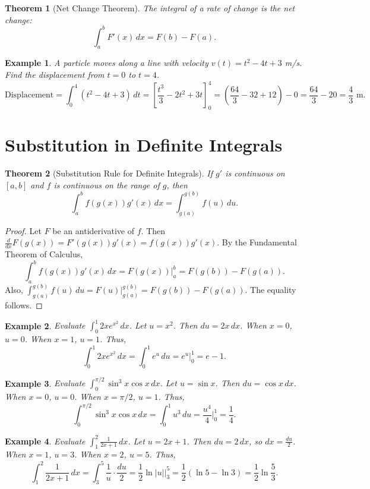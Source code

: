 \documentclass[11pt,a4paper]{article}
\newtheorem{example}{Example}
\newtheorem{theorem}{Theorem}
\begin{document}
\begin{theorem}[Net Change Theorem]
The integral of a rate of change is the net change:
\[
\int_a^b F'(x) \, dx = F(b) - F(a).
\]
\end{theorem}
\begin{example}
A particle moves along a line with velocity $v(t) = t^2 - 4t + 3$ m/s. Find the displacement from $t = 0$ to $t = 4$.
\[
\text{Displacement} = \int_0^4 (t^2 - 4t + 3) \, dt = \left[ \frac{t^3}{3} - 2t^2 + 3t \right]_0^4 = \left( \frac{64}{3} - 32 + 12 \right) - 0 = \frac{64}{3} - 20 = \frac{4}{3} \text{ m}.
\]
\end{example}
\section{Substitution in Definite Integrals}
\begin{theorem}[Substitution Rule for Definite Integrals]
If $g'$ is continuous on $[a, b]$ and $f$ is continuous on the range of $g$, then
\[
\int_a^b f(g(x)) g'(x) \, dx = \int_{g(a)}^{g(b)} f(u) \, du.
\]
\end{theorem}
\begin{proof}
Let $F$ be an antiderivative of $f$. Then $\frac{d}{dx} F(g(x)) = F'(g(x)) g'(x) = f(g(x)) g'(x)$. By the Fundamental Theorem of Calculus,
\[
\int_a^b f(g(x)) g'(x) \, dx = F(g(x)) \Big|_a^b = F(g(b)) - F(g(a)).
\]
Also, $\int_{g(a)}^{g(b)} f(u) \, du = F(u) \Big|_{g(a)}^{g(b)} = F(g(b)) - F(g(a))$. The equality follows.
\end{proof}
\begin{example}
Evaluate $\displaystyle \int_0^1 2x e^{x^2} \, dx$.
Let $u = x^2$. Then $du = 2x \, dx$. When $x = 0$, $u = 0$. When $x = 1$, $u = 1$. Thus,
\[
\int_0^1 2x e^{x^2} \, dx = \int_0^1 e^u \, du = e^u \Big|_0^1 = e - 1.
\]
\end{example}
\begin{example}
Evaluate $\displaystyle \int_0^{\pi/2} \sin^3 x \cos x \, dx$.
Let $u = \sin x$. Then $du = \cos x \, dx$. When $x = 0$, $u = 0$. When $x = \pi/2$, $u = 1$. Thus,
\[
\int_0^{\pi/2} \sin^3 x \cos x \, dx = \int_0^1 u^3 \, du = \frac{u^4}{4} \Big|_0^1 = \frac{1}{4}.
\]
\end{example}
\begin{example}
Evaluate $\displaystyle \int_1^2 \frac{1}{2x+1} \, dx$.
Let $u = 2x + 1$. Then $du = 2 \, dx$, so $dx = \frac{du}{2}$. When $x = 1$, $u = 3$. When $x = 2$, $u = 5$. Thus,
\[
\int_1^2 \frac{1}{2x+1} \, dx = \int_3^5 \frac{1}{u} \cdot \frac{du}{2} = \frac{1}{2} \ln|u| \Big|_3^5 = \frac{1}{2} (\ln 5 - \ln 3) = \frac{1}{2} \ln\frac{5}{3}.
\]
\end{example}
\end{document}
